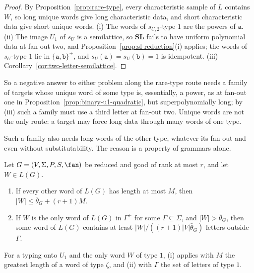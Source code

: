 \begin{proof}
By Proposition~\ref{prop:rare-type}, every characteristic sample of $L$ contains
$W$, so long unique words give long characteristic data, and short
characteristic data give short unique words.  (i) The words of $s_{U,2}$-type
$1$ are the powers of $\mathtt a$.  (ii) The image $U_1$ of $s_U$ is a semilattice,
so $\mathbf{SL}$ fails to have uniform polynomial data at fan-out two, and
Proposition~\ref{prop:sl-reduction}(i) applies; the words of $s_U$-type $1$ lie in
$\{\mathtt a,\mathtt b\}^+$, and $s_U(\mathtt a)=s_U(\mathtt b)=1$ is idempotent.  (iii)
Corollary~\ref{cor:two-letter-semilattice}.
\end{proof}

So a negative answer to either problem along the rare-type route needs a family
of targets whose unique word of some type is, essentially, a power, as at fan-out
one in Proposition~\ref{prop:binary-u1-quadratic}, but superpolynomially long; by
(iii) such a family must use a third letter at fan-out two.  Unique words are
not the only route: a target may force long data through many words of one type.

Such a family also needs long words of the other type, whatever its fan-out
and even without substitutability.  The reason is a property of grammars alone.

\begin{lemma}
\label{lem:unique-word-gap}
Let $G=(V,\Sigma,P,S,\fan)$ be reduced and good of rank at most $r$, and let
$W\in L(G)$.
\begin{enumerate}[label=\textup{(\roman*)},leftmargin=*]
\item If every other word of $L(G)$ has length at most $M$, then
$|W|\le\bar\theta_G+(r+1)M$.
\item If $W$ is the only word of $L(G)$ in $\Gamma^+$ for some $\Gamma\subseteq\Sigma$,
and $|W|>\bar\theta_G$, then some word of $L(G)$ contains at least
$|W|/((r+1)|V|\bar\theta_G)$ letters outside $\Gamma$.
\end{enumerate}
For a typing onto $U_1$ and the only word $W$ of type $1$, (i) applies with $M$ the
greatest length of a word of type $\zeta$, and (ii) with $\Gamma$ the set of letters
of type $1$.
\end{lemma}

